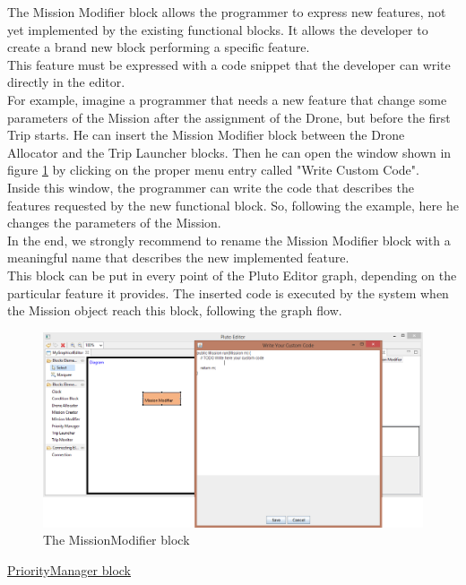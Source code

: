 The Mission Modifier block allows the programmer to express new features, not yet implemented  by the existing functional blocks.
It allows the developer to create a brand new block performing a specific feature.
\\
This feature must be expressed with a code snippet that the developer can write directly in the editor.
\\
For example, imagine a programmer that needs a new feature that change some parameters of the Mission after the assignment of the Drone, but before the first Trip starts. 
He can insert the Mission Modifier block between the Drone Allocator and the Trip Launcher blocks. 
Then he can open the window shown in figure \ref{fig:missionmodifier} by clicking on the proper menu entry called "Write Custom Code".
\\
Inside this window, the programmer can write the code that describes the features requested by the new functional block.
So, following the example, here he changes the parameters of the Mission.
\\
In the end, we strongly recommend to rename the Mission Modifier block with a meaningful name that describes the new implemented  feature.
\\
This block can be put in every point of the Pluto Editor graph, depending on the particular feature it provides.
The inserted code is executed by the system when the Mission object reach this block, following the graph flow.
\\

\begin{figure}[H]
\centering
\includegraphics[width=\linewidth]
{pictures/MissionModifier.png}
  \caption{The MissionModifier block}
  \label{fig:missionmodifier}
\end{figure}

\newpage

\underline{PriorityManager block}
\\


